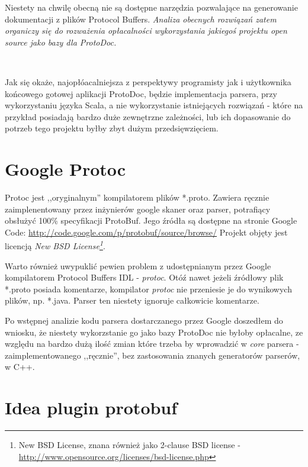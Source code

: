 \documentclass[pdflatex,11pt]{aghdpl}
\begin{document}
Niestety na chwilę obecną nie są dostępne narzędzia pozwalające na generowanie dokumentacji z plików Protocol Buffers.
\textit{Analiza obecnych rozwiązań zatem organiczy się do rozważenia opłacalności wykorzystania jakiegoś projektu open source jako bazy dla ProtoDoc.}

~\\\*

Jak się okaże, najopłóacalniejsza z perspektywy programisty jak i użytkownika końcowego gotowej aplikacji ProtoDoc, będzie implementacja parsera,
przy wykorzystaniu języka Scala, a nie wykorzystanie istniejących rozwiązań - które na przykład posiadają bardzo duże zewnętrzne zależności, lub
ich dopasowanie do potrzeb tego projektu byłby zbyt dużym przedsięwzięciem.

\section{Google Protoc}

Protoc jest ,,oryginalnym'' kompilatorem plików *.proto. Zawiera ręcznie zaimplenentowany przez inżynierów google skaner oraz parser,
potrafiący obsłużyć 100\% specyfikacji ProtoBuf. Jego źródła są dostępne na stronie Google Code: \href{http://code.google.com/p/protobuf/source/browse/}{http://code.google.com/p/protobuf/source/browse/}
Projekt objęty jest licencją \textit{New BSD License\footnote{New BSD License, znana również jako 2-clause BSD license - \href{http://www.opensource.org/licenses/bsd-license.php}{http://www.opensource.org/licenses/bsd-license.php}}}.

Warto również uwypuklić pewien problem z udostępnianym przez Google kompilatorem Protocol Buffers IDL - \textit{protoc}.
Otóź nawet jeżeli źródłowy plik *.proto posiada komentarze, kompilator \textit{protoc} nie przeniesie je do wynikowych plików, np. *.java.
Parser ten niestety ignoruje całkowicie komentarze. 

Po wstępnej analizie kodu parsera dostarczanego przez Google doszedłem do wniosku, 
że niestety wykorzstanie go jako bazy ProtoDoc nie byłoby opłacalne, ze względu na bardzo dużą ilość zmian które trzeba by wprowadzić w \textit{core} parsera
 - zaimplementowanego ,,ręcznie'', bez zastosowania znanych generatorów parserów, w C++.

\section{Idea plugin protobuf}
\end{document}
